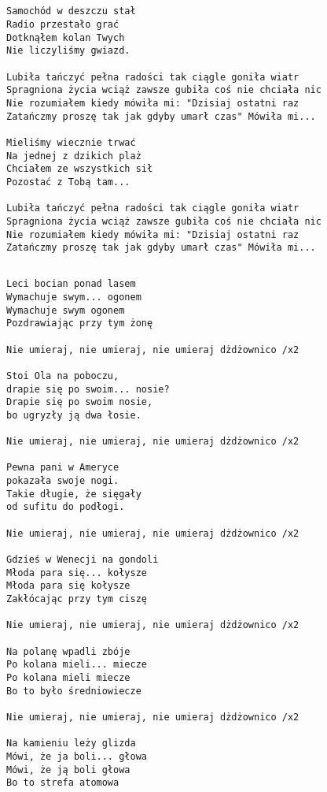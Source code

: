 \documentclass[12pt]{article}
\begin{document}
\subsection*{}
\begin{verbatim}
Samochód w deszczu stał
Radio przestało grać
Dotknąłem kolan Twych
Nie liczyliśmy gwiazd.

Lubiła tańczyć pełna radości tak ciągle goniła wiatr
Spragniona życia wciąż zawsze gubiła coś nie chciała nic
Nie rozumiałem kiedy mówiła mi: "Dzisiaj ostatni raz
Zatańczmy proszę tak jak gdyby umarł czas" Mówiła mi...

Mieliśmy wiecznie trwać
Na jednej z dzikich plaż
Chciałem ze wszystkich sił
Pozostać z Tobą tam...

Lubiła tańczyć pełna radości tak ciągle goniła wiatr
Spragniona życia wciąż zawsze gubiła coś nie chciała nic
Nie rozumiałem kiedy mówiła mi: "Dzisiaj ostatni raz
Zatańczmy proszę tak jak gdyby umarł czas" Mówiła mi...
\end{verbatim}
\clearpage

\subsection*{}
\begin{verbatim}
Leci bocian ponad lasem
Wymachuje swym... ogonem
Wymachuje swym ogonem
Pozdrawiając przy tym żonę

Nie umieraj, nie umieraj, nie umieraj dżdżownico /x2

Stoi Ola na poboczu,
drapie się po swoim... nosie?
Drapie się po swoim nosie,
bo ugryzły ją dwa łosie.

Nie umieraj, nie umieraj, nie umieraj dżdżownico /x2

Pewna pani w Ameryce
pokazała swoje nogi.
Takie długie, że sięgały
od sufitu do podłogi.

Nie umieraj, nie umieraj, nie umieraj dżdżownico /x2

Gdzieś w Wenecji na gondoli
Młoda para się... kołysze
Młoda para się kołysze
Zakłócając przy tym ciszę

Nie umieraj, nie umieraj, nie umieraj dżdżownico /x2

Na polanę wpadli zbóje
Po kolana mieli... miecze
Po kolana mieli miecze
Bo to było średniowiecze

Nie umieraj, nie umieraj, nie umieraj dżdżownico /x2

Na kamieniu leży glizda
Mówi, że ja boli... głowa
Mówi, że ją boli głowa
Bo to strefa atomowa
\end{verbatim}
\clearpage
\end{document}
